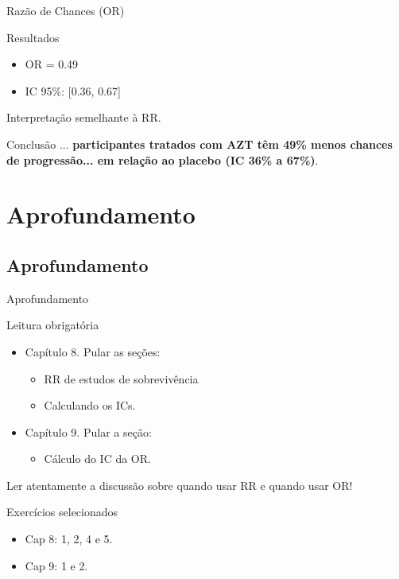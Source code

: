 \documentclass{beamer}
\begin{document}
\begin{frame}{Razão de Chances (OR)}
  \begin{exampleblock}{Resultados}
    \begin{itemize}
    \item OR = 0.49
    \item IC 95\%: [0.36, 0.67]
    \end{itemize}
  \end{exampleblock}
  \begin{center}
    Interpretação semelhante à RR.
  \end{center}
  \begin{exampleblock}{Conclusão}
    ... {\bf participantes tratados com AZT têm 49\% menos chances de progressão... em relação ao placebo (IC 36\% a 67\%)}.
  \end{exampleblock}
\end{frame}

\section{Aprofundamento}

\subsection{Aprofundamento}

\begin{frame}{Aprofundamento}
  \footnotesize
  \begin{block}{Leitura obrigatória}
    \begin{itemize}
    \item Capítulo 8. Pular as seções:
      \begin{itemize}
        \scriptsize
      \item RR de estudos de sobrevivência
      \item Calculando os ICs.
      \end{itemize}
    \item Capítulo 9. Pular a seção:
      \begin{itemize}
        \scriptsize
      \item Cálculo do IC da OR.
      \end{itemize}
    \end{itemize}
    \begin{block}{}
      Ler \alert{atentamente} a discussão sobre quando usar RR e quando usar OR!
    \end{block}
  \end{block}
  \begin{block}{Exercícios selecionados}
    \begin{itemize}
    \item Cap 8: 1, 2, 4 e 5.
    \item Cap 9: 1 e 2.
    \end{itemize}
  \end{block}
\end{frame}
\end{document}
